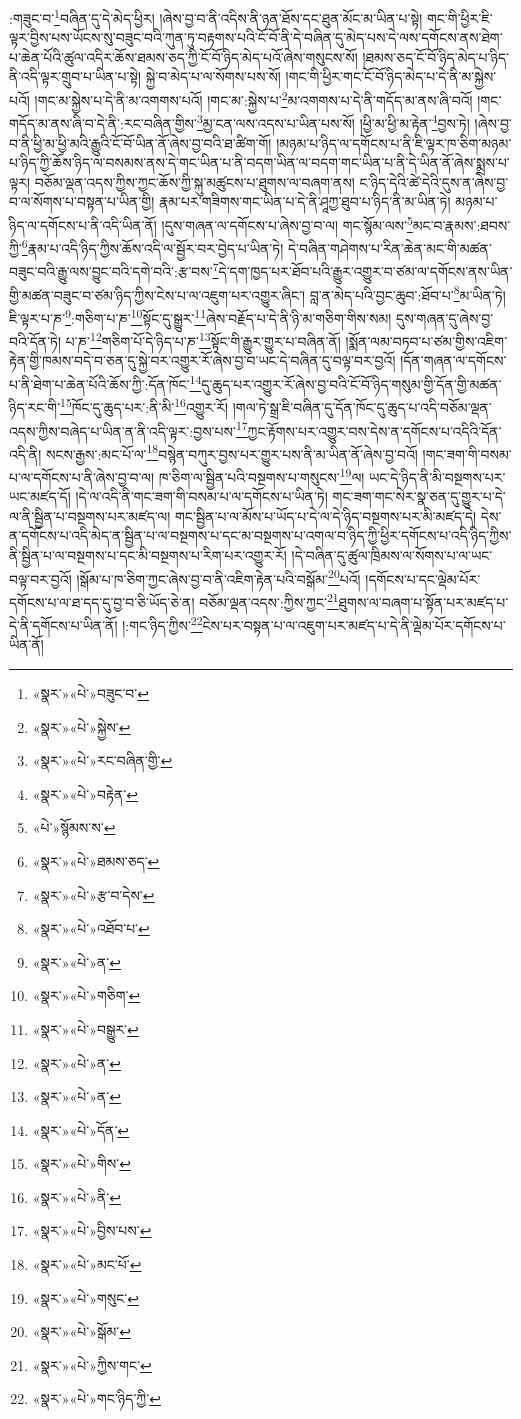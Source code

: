 :གཟུང་བ་\footnote{«སྣར་»«པེ་»བཟུང་བ་}བཞིན་དུ་དེ་མེད་ཕྱིར། །ཞེས་བྱ་བ་ནི་འདིས་ནི་ཉན་ཐོས་དང་ཐུན་མོང་མ་ཡིན་པ་སྟེ། གང་གི་ཕྱིར་ཇི་ལྟར་བྱིས་པས་ཡོངས་སུ་བཟུང་བའི་ཀུན་ཏུ་བརྟགས་པའི་ངོ་བོ་ནི་དེ་བཞིན་དུ་མེད་པས་དེ་ལས་དགོངས་ནས་ཐེག་པ་ཆེན་པོའི་ཚུལ་འདིར་ཆོས་ཐམས་ཅད་ཀྱི་ངོ་བོ་ཉིད་མེད་པའོ་ཞེས་གསུངས་སོ། །ཐམས་ཅད་ངོ་བོ་ཉིད་མེད་པ་ཉིད་ནི་འདི་ལྟར་གྲུབ་པ་ཡིན་པ་སྟེ། སྐྱེ་བ་མེད་པ་ལ་སོགས་པས་སོ། །གང་གི་ཕྱིར་གང་ངོ་བོ་ཉིད་མེད་པ་དེ་ནི་མ་སྐྱེས་པའོ། །གང་མ་སྐྱེས་པ་དེ་ནི་མ་འགགས་པའོ། །གང་མ་:སྐྱེས་པ་\footnote{«སྣར་»«པེ་»སྐྱེས་}མ་འགགས་པ་དེ་ནི་གདོད་མ་ནས་ཞི་བའོ། །གང་གདོད་མ་ནས་ཞི་བ་དེ་ནི་:རང་བཞིན་གྱིས་\footnote{«སྣར་»«པེ་»རང་བཞིན་གྱི་}མྱ་ངན་ལས་འདས་པ་ཡིན་པས་སོ། །ཕྱི་མ་ཕྱི་མ་རྟེན་\footnote{«སྣར་»«པེ་»བརྟེན་}བྱས་ཏེ། །ཞེས་བྱ་བ་ནི་ཕྱི་མ་ཕྱི་མའི་རྒྱུའི་ངོ་བོ་ཡིན་ནོ་ཞེས་བྱ་བའི་ཐ་ཚིག་གོ། །མཉམ་པ་ཉིད་ལ་དགོངས་པ་ནི་ཇི་ལྟར་ཁ་ཅིག་མཉམ་པ་ཉིད་ཀྱི་ཆོས་ཉིད་ལ་བསམས་ནས་དེ་གང་ཡིན་པ་ནི་བདག་ཡིན་ལ་བདག་གང་ཡིན་པ་ནི་དེ་ཡིན་ནོ་ཞེས་སྨྲས་པ་ལྟར། བཅོམ་ལྡན་འདས་ཀྱིས་ཀྱང་ཆོས་ཀྱི་སྐུ་མཚུངས་པ་ཐུགས་ལ་བཞག་ནས། ང་ཉིད་དེའི་ཚེ་དེའི་དུས་ན་ཞེས་བྱ་བ་ལ་སོགས་པ་བསྟན་པ་ཡིན་གྱི། རྣམ་པར་གཟིགས་གང་ཡིན་པ་དེ་ནི་ཤཱཀྱ་ཐུབ་པ་ཉིད་ནི་མ་ཡིན་ཏེ། མཉམ་པ་ཉིད་ལ་དགོངས་པ་ནི་འདི་ཡིན་ནོ། །དུས་གཞན་ལ་དགོངས་པ་ཞེས་བྱ་བ་ལ། གང་སྙོམ་ལས་\footnote{«པེ་»སྙོམས་ས་}མང་བ་རྣམས་:ཐབས་ཀྱི་\footnote{«སྣར་»«པེ་»ཐམས་ཅད་}རྣམ་པ་འདི་ཉིད་ཀྱིས་ཆོས་འདི་ལ་སྦྱོར་བར་བྱེད་པ་ཡིན་ཏེ། དེ་བཞིན་གཤེགས་པ་རིན་ཆེན་མང་གི་མཚན་བཟུང་བའི་རྒྱུ་ལས་བྱུང་བའི་དགེ་བའི་:རྩ་བས་\footnote{«སྣར་»«པེ་»རྩ་བ་དེས་}དེ་དག་ཁྱད་པར་ཐོབ་པའི་རྒྱུར་འགྱུར་བ་ཙམ་ལ་དགོངས་ནས་ཡིན་གྱི་མཚན་བཟུང་བ་ཙམ་ཉིད་ཀྱིས་ངེས་པ་ལ་འཇུག་པར་འགྱུར་ཞིང་། བླ་ན་མེད་པའི་བྱང་ཆུབ་:ཐོབ་པ་\footnote{«སྣར་»«པེ་»འཐོབ་པ་}མ་ཡིན་ཏེ། ཇི་ལྟར་པ་ཎ་\footnote{«སྣར་»«པེ་»ན་}:གཅིག་པ་ཎ་\footnote{«སྣར་»«པེ་»གཅིག་}སྟོང་དུ་སྒྱུར་\footnote{«སྣར་»«པེ་»བསྒྱུར་}ཞེས་བརྗོད་པ་དེ་ནི་ཉི་མ་གཅིག་གིས་སམ། དུས་གཞན་དུ་ཞེས་བྱ་བའི་དོན་ཏེ། པ་ཎ་\footnote{«སྣར་»«པེ་»ན་}གཅིག་པོ་དེ་ཉིད་པ་ཎ་\footnote{«སྣར་»«པེ་»ན་}སྟོང་གི་རྒྱུར་གྱུར་པ་བཞིན་ནོ། །སྨོན་ལམ་བཏབ་པ་ཙམ་གྱིས་འཇིག་རྟེན་གྱི་ཁམས་བདེ་བ་ཅན་དུ་སྐྱེ་བར་འགྱུར་རོ་ཞེས་བྱ་བ་ཡང་དེ་བཞིན་དུ་བལྟ་བར་བྱའོ། །དོན་གཞན་ལ་དགོངས་པ་ནི་ཐེག་པ་ཆེན་པོའི་ཆོས་ཀྱི་:དོན་ཁོང་\footnote{«སྣར་»«པེ་»དོན་}དུ་ཆུད་པར་འགྱུར་རོ་ཞེས་བྱ་བའི་ངོ་བོ་ཉིད་གསུམ་གྱི་དོན་གྱི་མཚན་ཉིད་རང་གི་\footnote{«སྣར་»«པེ་»གིས་}ཁོང་དུ་ཆུད་པར་:ནི་མི་\footnote{«སྣར་»«པེ་»ནི་}འགྱུར་རོ། །གལ་ཏེ་སྒྲ་ཇི་བཞིན་དུ་དོན་ཁོང་དུ་ཆུད་པ་འདི་བཅོམ་ལྡན་འདས་ཀྱིས་བཞེད་པ་ཡིན་ན་ནི་འདི་ལྟར་:བྱས་པས་\footnote{«སྣར་»«པེ་»བྱིས་པས་}ཀྱང་རྟོགས་པར་འགྱུར་བས་དེས་ན་དགོངས་པ་འདིའི་དོན་འདི་ནི། སངས་རྒྱས་:མང་པོ་ལ་\footnote{«སྣར་»«པེ་»མང་པོ་}བསྙེན་བཀུར་བྱས་པར་གྱུར་པས་ནི་མ་ཡིན་ནོ་ཞེས་བྱ་བའོ། །གང་ཟག་གི་བསམ་པ་ལ་དགོངས་པ་ནི་ཞེས་བྱ་བ་ལ། ཁ་ཅིག་ལ་སྦྱིན་པའི་བསྔགས་པ་གསུངས་\footnote{«སྣར་»«པེ་»གསུང་}ལ། ཡང་དེ་ཉིད་ནི་མི་བསྔགས་པར་ཡང་མཛད་དོ། །དེ་ལ་འདི་ནི་གང་ཟག་གི་བསམ་པ་ལ་དགོངས་པ་ཡིན་ཏེ། གང་ཟག་གང་སེར་སྣ་ཅན་དུ་གྱུར་པ་དེ་ལ་ནི་སྦྱིན་པ་བསྔགས་པར་མཛད་ལ། གང་སྦྱིན་པ་ལ་མོས་པ་ཡོད་པ་དེ་ལ་དེ་ཉིད་བསྔགས་པར་མི་མཛད་དེ། དེས་ན་དགོངས་པ་འདི་མེད་ན་སྦྱིན་པ་ལ་བསྔགས་པ་དང་མ་བསྔགས་པ་འགལ་བ་ཉིད་ཀྱི་ཕྱིར་དགོངས་པ་འདི་ཉིད་ཀྱིས་ནི་སྦྱིན་པ་ལ་བསྔགས་པ་དང་མི་བསྔགས་པ་རིག་པར་འགྱུར་རོ། །དེ་བཞིན་དུ་ཚུལ་ཁྲིམས་ལ་སོགས་པ་ལ་ཡང་བལྟ་བར་བྱའོ། །སྒོམ་པ་ཁ་ཅིག་ཀྱང་ཞེས་བྱ་བ་ནི་འཇིག་རྟེན་པའི་བསྒོམ་\footnote{«སྣར་»«པེ་»སྒོམ་}པའོ། །དགོངས་པ་དང་ལྡེམ་པོར་དགོངས་པ་ལ་ཐ་དད་དུ་བྱ་བ་ཅི་ཡོད་ཅེ་ན། བཅོམ་ལྡན་འདས་:ཀྱིས་ཀྱང་\footnote{«སྣར་»«པེ་»ཀྱིས་གང་}ཐུགས་ལ་བཞག་པ་སྟོན་པར་མཛད་པ་དེ་ནི་དགོངས་པ་ཡིན་ནོ། །:གང་ཉིད་ཀྱིས་\footnote{«སྣར་»«པེ་»གང་ཉིད་ཀྱི་}ངེས་པར་བསྟན་པ་ལ་འཇུག་པར་མཛད་པ་དེ་ནི་ལྡེམ་པོར་དགོངས་པ་ཡིན་ནོ། 